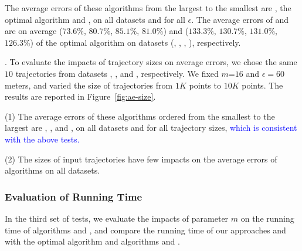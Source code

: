 {The average errors of these algorithms from the largest to the smallest are \cista, the optimal algorithm and \cist, on all datasets and for all $\epsilon$.
The average errors of \cist and \cista are on average
($73.6\%$, $80.7\%$, $85.1\%$, $81.0\%$)
and ($133.3\%$, $130.7\%$, $131.0\%$, $126.3\%$)
of the optimal algorithm on datasets (\sercar, \geolife, \mopsi, \pricar), respectively.

.
To evaluate the impacts of trajectory sizes on average errors, we chose the same
{$10$} trajectories from  datasets \sercar, \geolife, \mopsi and \pricar, respectively.
We fixed {$m$=$16$} and $\epsilon = 60$ meters, and varied the size  of trajectories from $1K$ points to $10K$ points.
%
The results are reported in Figure~\ref{fig:ae-size}.

\ni(1) The average errors of these algorithms ordered from the smallest to the largest are \squishe, \dps, \cist and \cista, on all datasets and for all trajectory sizes,
\textcolor{blue}{which is consistent with the above tests.}

\ni(2) The sizes of input trajectories have few impacts on the average errors of \lsa algorithms on all datasets.



	





\subsubsection{Evaluation of Running Time}

In the third set of tests, we evaluate the impacts of parameter $m$ on the running time of algorithms \cist and \cista, and compare the running time of our approaches \cist and \cista with the optimal algorithm and algorithms \dps and \squishe.

%

}
